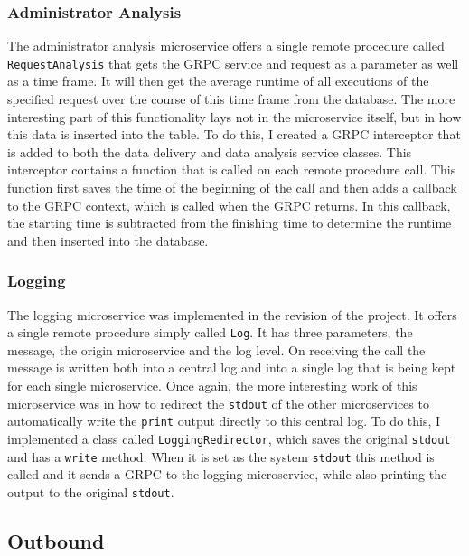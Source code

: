 \documentclass[11pt]{article}
\begin{document}
	\subsubsection{Administrator Analysis}
	
	The administrator analysis microservice offers a single remote procedure called \texttt{RequestAnalysis} that gets the GRPC service and request as a parameter as well as a time frame. It will then get the average runtime of all executions of the specified request over the course of this time frame from the database. The more interesting part of this functionality lays not in the microservice itself, but in how this data is inserted into the table. To do this, I created a GRPC interceptor that is added to both the data delivery and data analysis service classes. This interceptor contains a function that is called on each remote procedure call. This function first saves the time of the beginning of the call and then adds a callback to the GRPC context, which is called when the GRPC returns. In this callback, the starting time is subtracted from the finishing time to determine the runtime and then inserted into the database.
	
	\subsubsection{Logging}
	
	The logging microservice was implemented in the revision of the project. It offers a single remote procedure simply called \texttt{Log}. It has three parameters, the message, the origin microservice and the log level. On receiving the call the message is written both into a central log and into a single log that is being kept for each single microservice. Once again, the more interesting work of this microservice was in how to redirect the \texttt{stdout} of the other microservices to automatically write the \texttt{print} output directly to this central log. To do this, I implemented a class called \texttt{LoggingRedirector}, which saves the original \texttt{stdout} and has a \texttt{write} method. When it is set as the system \texttt{stdout} this method is called and it sends a GRPC to the logging microservice, while also printing the output to the original \texttt{stdout}.
	
	\subsection{Outbound}
	
\end{document}
